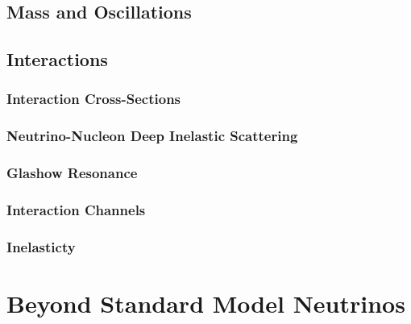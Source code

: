 \subsection{Mass and Oscillations}
\label{sec:nu_mass_osc}

\subsection{Interactions}
\label{sec:nu_interactions}

\subsubsection*{Interaction Cross-Sections}
\label{sec:xsec}

\subsubsection*{Neutrino-Nucleon Deep Inelastic Scattering}
\label{sec:DIS}

\subsubsection*{Glashow Resonance}
\label{sec:glashow}

\subsubsection*{Interaction  Channels}
\label{sec:int_channels}

\subsubsection*{Inelasticty}
\label{sec:inelasticity}


\section{Beyond Standard Model Neutrinos}
\label{sec:bsm}